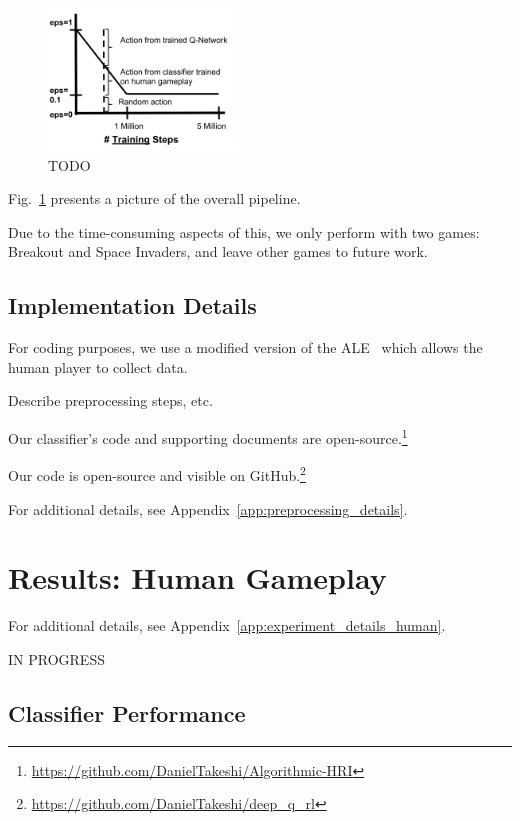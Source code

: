\documentclass[letterpaper, 10pt, conference]{ieeeconf}
\begin{document}
\begin{figure}[t]
\centering
\includegraphics[width=0.45\textwidth]{figures/dqn_with_human_data_graph.png}
\caption{\footnotesize
TODO
}
\label{fig:human-guided-dqn}
\end{figure}

Fig.~\ref{fig:human-guided-dqn} presents a picture of the overall pipeline.

Due to the time-consuming aspects of this, we only perform with two games:
Breakout and Space Invaders, and leave other games to future work.

\subsection{Implementation Details}\label{ssec:implementation}

For coding purposes, we use a modified version of the
ALE~\cite{bellemare13arcade} which allows the human player to collect data. 

Describe preprocessing steps, etc.

Our classifier's code and supporting documents are
open-source.\footnote{\url{https://github.com/DanielTakeshi/Algorithmic-HRI}}

Our code is open-source and visible on
GitHub.\footnote{\url{https://github.com/DanielTakeshi/deep_q_rl}}

For additional details, see Appendix~\ref{app:preprocessing_details}.



\section{Results: Human Gameplay}\label{sec:results_p1}

For additional details, see Appendix~\ref{app:experiment_details_human}.

IN PROGRESS

\subsection{Classifier Performance}
\end{document}
